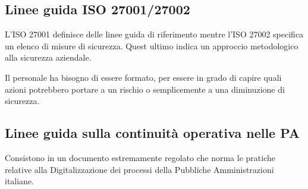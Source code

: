 \subsection{Linee guida ISO 27001/27002}

L'ISO 27001 definisce delle linee guida di riferimento mentre l'ISO 27002
specifica un elenco di misure di sicurezza. Quest ultimo indica un approccio
metodologico alla sicurezza aziendale.

Il personale ha bisogno di essere formato, per essere in grado di capire quali
azioni potrebbero portare a un rischio o semplicemente a una diminuzione di
sicurezza.

\subsection{Linee guida sulla continuit\`a operativa nelle PA}
Consistono in un documento estremamente regolato che norma le pratiche relative alla Digitalizzazione dei processi della Pubbliche Amministrazioni italiane.